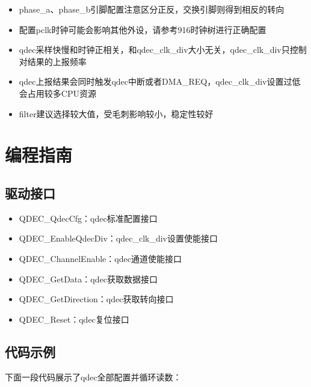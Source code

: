 \documentclass[
  12pt,
]{book}
\begin{document}
\begin{itemize}
\item
  phase\_a、phase\_b引脚配置注意区分正反，交换引脚则得到相反的转向
\item
  配置pclk时钟可能会影响其他外设，请参考916时钟树进行正确配置
\item
  qdec采样快慢和时钟正相关，和qdec\_clk\_div大小无关，qdec\_clk\_div只控制对结果的上报频率
\item
  qdec上报结果会同时触发qdec中断或者DMA\_REQ，qdec\_clk\_div设置过低会占用较多CPU资源
\item
  filter建议选择较大值，受毛刺影响较小，稳定性较好
\end{itemize}

\hypertarget{ux7f16ux7a0bux6307ux5357-5}{%
\section{编程指南}\label{ux7f16ux7a0bux6307ux5357-5}}

\hypertarget{ux9a71ux52a8ux63a5ux53e3-5}{%
\subsection{驱动接口}\label{ux9a71ux52a8ux63a5ux53e3-5}}

\begin{itemize}
\item
  QDEC\_QdecCfg：qdec标准配置接口
\item
  QDEC\_EnableQdecDiv：qdec\_clk\_div设置使能接口
\item
  QDEC\_ChannelEnable：qdec通道使能接口
\item
  QDEC\_GetData：qdec获取数据接口
\item
  QDEC\_GetDirection：qdec获取转向接口
\item
  QDEC\_Reset：qdec复位接口
\end{itemize}

\hypertarget{ux4ee3ux7801ux793aux4f8b-5}{%
\subsection{代码示例}\label{ux4ee3ux7801ux793aux4f8b-5}}

下面一段代码展示了qdec全部配置并循环读数：
\end{document}
